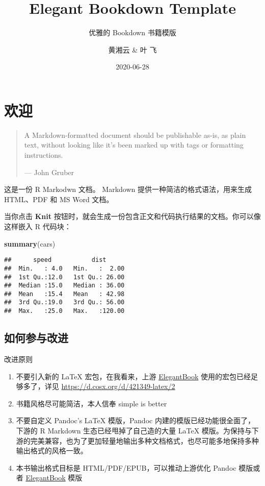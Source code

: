\documentclass[
  lang=cn,
  11pt,
  scheme=chinese,
  chinesefont=nofont,
  bibstyle=apalike]{elegantbook}
\institute{A bookdown wrapper for ElegantBook}
\title{Elegant Bookdown Template}
\subtitle{优雅的 Bookdown 书籍模版}
\author{黄湘云 \& 叶 飞}
\date{2020-06-28}
\newenvironment{Shaded}{\begin{snugshade}}{\end{snugshade}}
\newcommand{\KeywordTok}[1]{\textcolor[rgb]{0.13,0.29,0.53}{\textbf{#1}}}
\newcommand{\NormalTok}[1]{#1}
\begin{document}
\maketitle

{
\hypersetup{linkcolor=Maroon}
\setcounter{tocdepth}{2}
\tableofcontents
}
\listoftables
\listoffigures
\mainmatter

\hypertarget{welcome}{%
\chapter{欢迎}\label{welcome}}

\begin{quote}
A Markdown-formatted document should be publishable as-is, as plain text, without looking like it's been marked up with tags or formatting instructions.

\hspace*{\fill} --- John Gruber
\end{quote}

这是一份 R Markodwn 文档。 Markdown 提供一种简洁的格式语法，用来生成 HTML、PDF 和 MS Word 文档。

当你点击 \textbf{Knit} 按钮时，就会生成一份包含正文和代码执行结果的文档。你可以像这样嵌入 R 代码块：

\begin{Shaded}
\begin{Highlighting}[]
\KeywordTok{summary}\NormalTok{(cars)}
\end{Highlighting}
\end{Shaded}

\begin{verbatim}
##      speed           dist       
##  Min.   : 4.0   Min.   :  2.00  
##  1st Qu.:12.0   1st Qu.: 26.00  
##  Median :15.0   Median : 36.00  
##  Mean   :15.4   Mean   : 42.98  
##  3rd Qu.:19.0   3rd Qu.: 56.00  
##  Max.   :25.0   Max.   :120.00
\end{verbatim}

\hypertarget{pr}{%
\section{如何参与改进}\label{pr}}

改进原则

\begin{enumerate}
\def\labelenumi{\arabic{enumi}.}

\item
  不要引入新的 LaTeX 宏包，在我看来，上游 \href{https://github.com/ElegantLaTeX/ElegantBook}{ElegantBook} 使用的宏包已经足够多了，详见 \url{https://d.cosx.org/d/421349-latex/2}
\item
  书籍风格尽可能简洁，本人信奉 simple is better
\item
  不要自定义 Pandoc's LaTeX 模版，Pandoc 内建的模版已经功能很全面了，下游的 R Markdown 生态已经甩掉了自己造的大量 LaTeX 模版。为保持与下游的完美兼容，也为了更加轻量地输出多种文档格式，也尽可能多地保持多种输出格式的风格一致。
\item
  本书输出格式目标是 HTML/PDF/EPUB，可以推动上游优化 Pandoc 模版或者 \href{https://github.com/ElegantLaTeX/ElegantBook}{ElegantBook} 模版
\end{enumerate}
\end{document}
